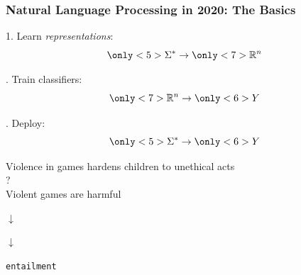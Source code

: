 \documentclass[t,xcolor={svgnames,table}]{beamer}
\begin{document}
\begin{frame}
\frametitle{Natural Language Processing in 2020: The Basics}
{
1. Learn {\only<7>{\color{red}}\textit{representations}}:
\[{\Sigma^*}\to{\only<7>{\color{red}}\mathbb{R}^n}\]

. Train classifiers:
\[{\only<7>{\color{red}}\mathbb{R}^n}\to {\only<6>{\color{red}}Y}\]

. Deploy:
\[{\only<5>{\color{red}}\Sigma^*}\to {\only<6>{\color{red}}Y}\]

\pause
  \begin{center}
  \begin{adjustbox}{padding=1ex 1ex 1ex 1ex,frame,margin=1ex 1ex 1ex 1ex,minipage=[r][6ex][b]{.7\textwidth}}
  	\centering\rm{}\small
  	Violence in games hardens children to unethical acts \\ ? \\ Violent games are harmful
  \end{adjustbox}
  
  $\downarrow$
  
  {
  }
  
  $\downarrow$
  
  {\tt{}entailment}
  \end{center}
}
\end{frame}

\newcommand{\mask}[2]{\alt<#1>{\fbox{\textbf{\color{red}?}}}{#2}}
\end{document}
